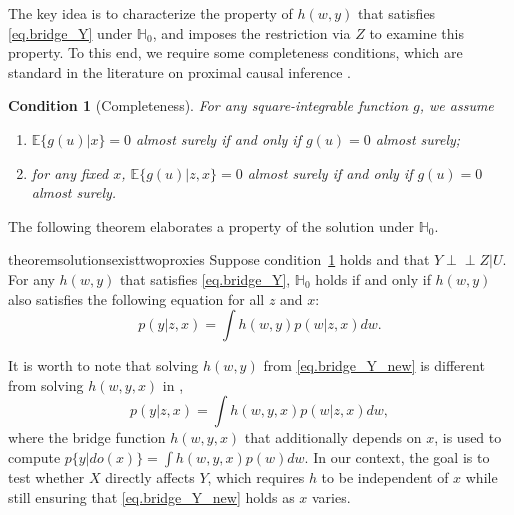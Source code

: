 \documentclass[
  12pt]{article}
\newtheorem{assumption}{Condition}
\newcommand{\ind}{\perp\!\!\!\!\perp}
\def\mH{\mathbb{H}}
\begin{document}
The key idea is to characterize the property of $h(w,y)$ that satisfies  \eqref{eq.bridge_Y} under $\mH_0$, and imposes the restriction via $Z$ to examine this property. To this end, we require some completeness conditions, which are standard in the literature on proximal causal inference \citep{miao2018identifying, liu2023causal, eric2024proxyintro}. 
\begin{assumption}[Completeness]
\label{assum.complete_U_X_Zx}
    For any square-integrable function $g$, we assume 
    \begin{enumerate}
        \item $\mathbb E\{g(u)|x\} = 0$ almost surely if and only if $g(u) = 0$ almost surely; 
        \item for any fixed $x$, $\mathbb E\{g(u)|z,x\} = 0$ almost surely if and only if $g(u) = 0$ almost surely.
    \end{enumerate}
\end{assumption}

The following theorem elaborates a property of the solution under $\mH_0$. 
\begin{restatable}{theorem}{solutionsexisttwoproxies}
\label{thm.exist_solution_twoproxies}
Suppose condition~\ref{assum.complete_U_X_Zx} holds and that $Y\ind Z|U$. For any $h(w,y)$ that satisfies \eqref{eq.bridge_Y}, $\mathbb H_0$ holds if and only if $h(w,y)$ also satisfies the following equation for all $z$ and $x$:
\begin{equation}
\label{eq.bridge_Y_new}
    p(y|z,x) = \int h(w,y)p(w|z,x)dw.
\end{equation}
\end{restatable}

It is worth to note that solving $h(w,y)$ from \eqref{eq.bridge_Y_new} is different from solving $h(w,y,x)$ in \cite{miao2018identifying}, 
$$p(y|z,x) = \int h(w,y,x)p(w|z,x)dw,
$$
where the bridge function $h(w,y,x)$ that additionally depends on $x$, is used to compute $p\{y|do(x)\}=\int h(w,y,x)p(w)dw$. 
In our context, the goal is to test whether $X$ directly affects $Y$, which requires $h$ to be independent of $x$ while still ensuring that \eqref{eq.bridge_Y_new} holds as $x$ varies. 
\end{document}
